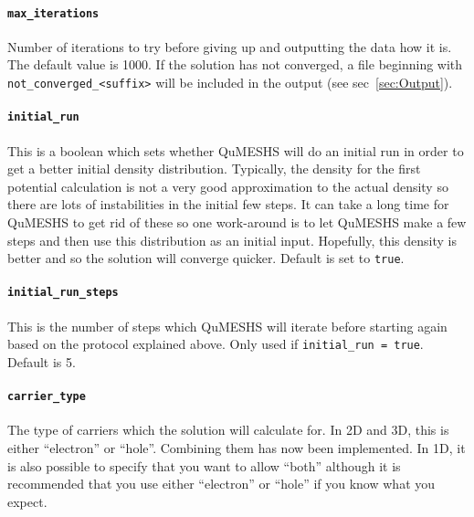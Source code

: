 \documentclass[12pt]{article}
\newcommand{\red}[1]{{\color{red} \it #1}}
\newcommand{\commentout}[1]{}
\begin{document}
\paragraph{\texttt{max\_iterations}}
Number of iterations to try before giving up and outputting the data how it is.  The
default value is 1000.  If the solution has not converged, a file beginning with
\texttt{not\_converged\_<suffix>} will be included in the output (see sec~\ref{sec:Output}).

\paragraph{\texttt{initial\_run}}
This is a boolean which sets whether QuMESHS will do an initial run in order to get a
better initial density distribution.  Typically, the density for the first potential
calculation is not a very good approximation to the actual density so there are lots of
instabilities in the initial few steps.  It can take a long time for QuMESHS to get rid
of these so one work-around is to let QuMESHS make a few steps and then use this distribution
as an initial input.  Hopefully, this density is better and so the solution will converge quicker.
Default is set to \texttt{true}.

\paragraph{\texttt{initial\_run\_steps}}
This is the number of steps which QuMESHS will iterate before starting again based on
the protocol explained above.  Only used if \texttt{initial\_run = true}.  Default is
5.

\paragraph{\texttt{carrier\_type}}
The type of carriers which the solution will calculate for.  In 2D and 3D, this is either
``electron'' or ``hole''.  Combining them has now been implemented.  In 1D, it is also possible
to specify that you want to allow ``both'' although it is recommended that you use either
``electron'' or ``hole'' if you know what you expect.

\commentout{
\subsubsection{1D}

\red{I cannot think of any 1D specific input parameters\ldots}
}
\end{document}
